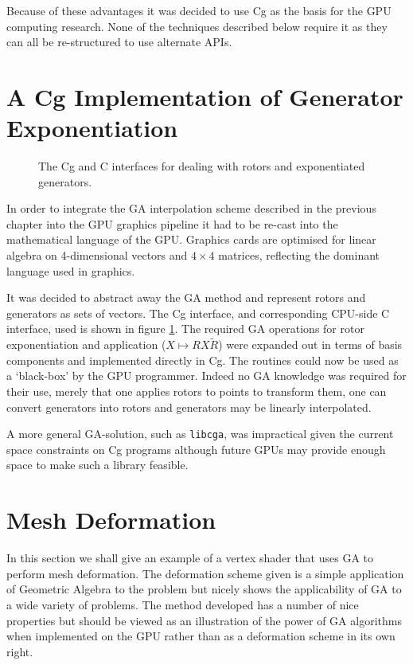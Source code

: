 Because of these advantages it was decided to use Cg as the basis for the GPU
computing research. None of the techniques described below require it as they
can all be re-structured to use alternate APIs.

\section{A Cg Implementation of Generator Exponentiation}

\begin{figure}[p]
\centering
{}
\caption{\label{fig:rotortools}The Cg and C interfaces for dealing with rotors and
  exponentiated generators.}
\end{figure}

In order to integrate the GA interpolation scheme described in the previous 
chapter into the GPU graphics pipeline it had to be re-cast into the 
mathematical language of the GPU. Graphics cards are optimised for 
linear algebra on 4-dimensional vectors and $4\times4$ matrices, reflecting
the dominant language used in graphics. 

It was decided to abstract away the GA method and represent rotors and
generators as sets of vectors. The Cg interface, and corresponding CPU-side C
interface, used is shown in figure \ref{fig:rotortools}. The required GA
operations for rotor exponentiation and application ($X \mapsto RX\tilde{R}$)
were expanded out in terms of basis components and implemented
directly in Cg. The routines could now be used as a `black-box' by the GPU 
programmer. Indeed no GA knowledge was required for their use, merely that one
applies rotors to points to transform them, one can convert generators into
rotors and generators may be linearly interpolated.

A more general GA-solution, such as {\tt libcga}, was impractical given the
current space constraints on Cg programs although future GPUs may provide
enough space to make such a library feasible.

\section{Mesh Deformation}

In this section we shall give an example of a vertex shader that uses GA to
perform mesh deformation. The deformation scheme given is a simple application
of Geometric Algebra to the problem but nicely shows the applicability of GA
to a wide variety of problems. The method developed has a number of nice 
properties but should be viewed as an illustration of the power of GA
algorithms when implemented on the GPU rather than as a deformation scheme
in its own right.

